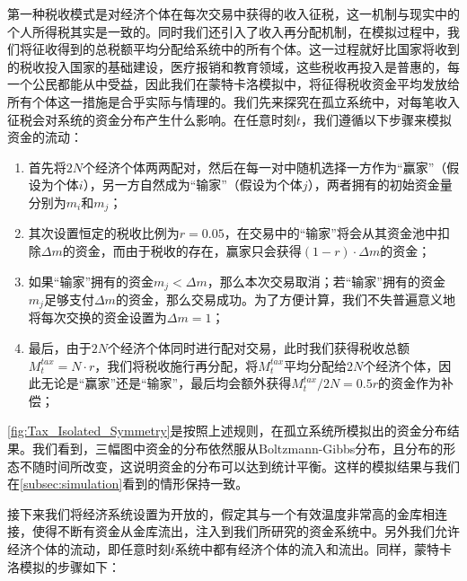 \documentclass[tsinghuacite]{HustGraduPaper}
\begin{document}
		
		第一种税收模式是对经济个体在每次交易中获得的收入征税，这一机制与现实中的个人所得税其实是一致的。同时我们还引入了收入再分配机制，在模拟过程中，我们将征收得到的总税额平均分配给系统中的所有个体。这一过程就好比国家将收到的税收投入国家的基础建设，医疗报销和教育领域，这些税收再投入是普惠的，每一个公民都能从中受益，因此我们在蒙特卡洛模拟中，将征得税收资金平均发放给所有个体这一措施是合乎实际与情理的。我们先来探究在孤立系统中，对每笔收入征税会对系统的资金分布产生什么影响。在任意时刻$t$，我们遵循以下步骤来模拟资金的流动：
		
		\begin{enumerate}[label=(\roman*)]
			\item 首先将$2N$个经济个体两两配对，然后在每一对中随机选择一方作为“赢家”（假设为个体$i$），另一方自然成为“输家”（假设为个体$j$），两者拥有的初始资金量分别为$m_i$和$m_j$；
			
			\item 其次设置恒定的税收比例为$r=0.05$，在交易中的“输家”将会从其资金池中扣除$\Delta m$的资金，而由于税收的存在，赢家只会获得$ (1-r) \cdot \Delta m$的资金；
			
			\item 如果“输家”拥有的资金$m_{j} < \Delta m$，那么本次交易取消；若“输家”拥有的资金$m_j$足够支付$\Delta m$的资金，那么交易成功。为了方便计算，我们不失普遍意义地将每次交换的资金设置为$\Delta m =  1$；
			
			\item 最后，由于$2N$个经济个体同时进行配对交易，此时我们获得税收总额$M_t^{tax} = N \cdot r $，我们将税收施行再分配，将$M_t^{tax}$平均分配给$2N$个经济个体，因此无论是“赢家”还是“输家”，最后均会额外获得$M_t^{tax}/2N = 0.5r$的资金作为补偿；
		
		\end{enumerate}	
		
		\autoref{fig:Tax_Isolated_Symmetry}是按照上述规则，在孤立系统所模拟出的资金分布结果。我们看到，三幅图中资金的分布依然服从Boltzmann-Gibbs分布，且分布的形态不随时间所改变，这说明资金的分布可以达到统计平衡。这样的模拟结果与我们在\autoref{subsec:simulation}看到的情形保持一致。
		
		接下来我们将经济系统设置为开放的，假定其与一个有效温度非常高的金库相连接，使得不断有资金从金库流出，注入到我们所研究的资金系统中。另外我们允许经济个体的流动，即任意时刻$t$系统中都有经济个体的流入和流出。同样，蒙特卡洛模拟的步骤如下：
		
\end{document}
